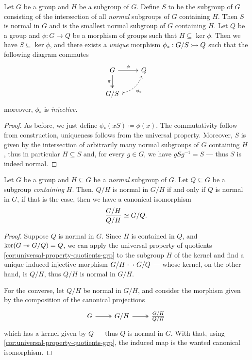 \begin{corollary}
\label{cor:universal-property-quotients-grp}
Let \(G\) be a group and \(H\) be a subgroup of \(G\). Define \(S\) to be the
subgroup of \(G\) consisting of the intersection of all \emph{normal} subgroups
of \(G\) containing \(H\). Then \(S\) is normal in \(G\) and is the smallest
normal subgroup of \(G\) containing \(H\). Let \(Q\) be a group and
\(\phi: G \to Q\) be a morphism of groups such that \(H \subseteq \ker
\phi\). Then we have \(S \subseteq \ker \phi\), and there exists a \emph{unique}
morphism \(\phi_{*}: G/S \rightarrowtail Q\) such that the following diagram commutes
\[
  \begin{tikzcd}
    G \ar[d, two heads, swap, "\pi"] \ar[r, "\phi"] &Q \\
    G/S \ar[ur, dashed, swap, bend right, tail, "\phi_{*}"] &
  \end{tikzcd}
\]
moreover, \(\phi_{*}\) is \emph{injective}.
\end{corollary}

\begin{proof}
As before, we just define \(\phi_{*}(x S) \coloneq \phi(x)\). The commutativity
follow from construction, uniqueness follows from the universal
property. Moreover, \(S\) is given by the intersection of arbitrarily many
normal subgroups of \(G\) containing \(H\), thus in particular \(H \subseteq S\)
and, for every \(g \in G\), we have \(g S g^{-1} = S\) --- thus \(S\) is indeed
normal.
\end{proof}

\begin{corollary}
\label{cor:quotient-isomorphism}
Let \(G\) be a group and \(H \subseteq G\) be a \emph{normal} subgroup of
\(G\). Let \(Q \subseteq G\) be a subgroup \emph{containing} \(H\). Then,
\(Q/H\) is normal in \(G/H\) if and only if \(Q\) is normal in \(G\), if that is
the case, then we have a canonical isomorphism
\[
  \frac{G/H}{Q/H} \simeq G/Q.
\]
\end{corollary}

\begin{proof}
Suppose \(Q\) is normal in \(G\). Since \(H\) is contained in \(Q\), and
\(\ker(G \twoheadrightarrow G/Q) = Q\), we can apply the universal property of quotients
\cref{cor:universal-property-quotients-grp} to the subgroup \(H\) of the kernel
and find a unique induced injective morphism \(G/H \rightarrowtail G/Q\) --- whose kernel,
on the other hand, is \(Q/H\), thus \(Q/H\) is normal in \(G/H\).

For the converse, let \(Q/H\) be normal in \(G/H\), and consider the morphism
given by the composition of the canonical projections
\[
  \begin{tikzcd}
    G \ar[r, two heads] &G/H \ar[r, two heads] &\frac{G/H}{Q/H}
  \end{tikzcd}
\]
which has a kernel given by \(Q\) --- thus \(Q\) is normal in \(G\). With that,
using \cref{cor:universal-property-quotients-grp}, the induced map is the wanted
canonical isomorphism.
\end{proof}

